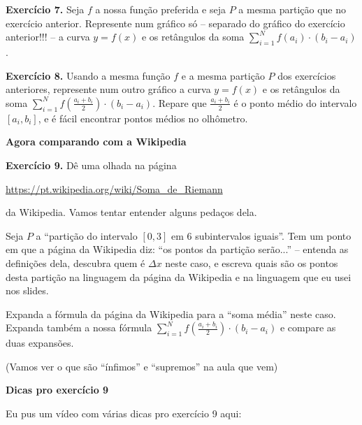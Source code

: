 \documentclass[oneside,12pt]{article}
\begin{document}
\msk

{\bf Exercício 7.} Seja $f$ a nossa função preferida e seja $P$ a
mesma partição que no exercício anterior. Represente num gráfico só --
separado do gráfico do exercício anterior!!! -- a curva $y=f(x)$ e os
retângulos da soma $\sum_{i=1}^N f(a_i)·(b_i-a_i)$.

\msk

{\bf Exercício 8.} Usando a mesma função $f$ e a mesma partição $P$
dos exercícios anteriores, represente num outro gráfico a curva
$y=f(x)$ e os retângulos da soma $\sum_{i=1}^N
f(\frac{a_i+b_i}{2})·(b_i-a_i)$. Repare que $\frac{a_i+b_i}{2}$ é o
ponto médio do intervalo $[a_i,b_i]$, e é fácil encontrar pontos
médios no olhômetro.

\newpage


{\bf Agora comparando com a Wikipedia}

\msk

{\bf Exercício 9.} Dê uma olhada na página

\ssk

\url{https://pt.wikipedia.org/wiki/Soma_de_Riemann}

\ssk

da Wikipedia. Vamos tentar entender alguns pedaços dela.

Seja $P$ a ``partição do intervalo $[0,3]$ em 6 subintervalos
iguais''. Tem um ponto em que a página da Wikipedia diz: ``os pontos
da partição serão...'' -- entenda as definições dela, descubra quem é
$Δx$ neste caso, e escreva quais são os pontos desta partição na
linguagem da página da Wikipedia e na linguagem que eu usei nos slides.

Expanda a fórmula da página da Wikipedia para a ``soma média'' neste
caso. Expanda também a nossa fórmula $\sum_{i=1}^N
f(\frac{a_i+b_i}{2})·(b_i-a_i)$ e compare as duas expansões.

\msk

(Vamos ver o que são ``ínfimos'' e ``supremos'' na aula que vem)

\newpage


{\bf Dicas pro exercício 9}

Eu pus um vídeo com várias dicas pro exercício 9 aqui:
\end{document}

